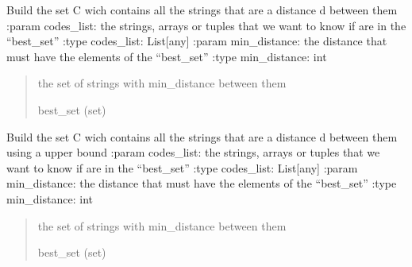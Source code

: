 \documentclass[letterpaper,10pt,english]{sphinxmanual}
\begin{document}
\begin{fulllineitems}
\label{\detokenize{index:hammindist.functions.max_set}}
\pysigstartsignatures
\pysiglinewithargsret
{}
{\sphinxparamcomma {}}
{}
\pysigstopsignatures
\sphinxAtStartPar
Build the set C wich contains all the strings that are a distance d between them
:param codes\_list: the strings, arrays or tuples that we want to know if are in the “best\_set”
:type codes\_list: List{[}any{]}
:param min\_distance: the distance that must have the elements of the “best\_set”
:type min\_distance: int
\begin{quote}\begin{description}
\sphinxAtStartPar
the set of strings with min\_distance between them

\sphinxAtStartPar
best\_set (set)

\end{description}\end{quote}

\end{fulllineitems}


\begin{fulllineitems}
\label{\detokenize{index:hammindist.functions.max_set_bounded}}
\pysigstartsignatures
\pysiglinewithargsret
{}
{\sphinxparamcomma {}}
{}
\pysigstopsignatures
\sphinxAtStartPar
Build the set C wich contains all the strings that are a distance d between
them using a upper bound
:param codes\_list: the strings, arrays or tuples that we want to know if are in the “best\_set”
:type codes\_list: List{[}any{]}
:param min\_distance: the distance that must have the elements of the “best\_set”
:type min\_distance: int
\begin{quote}\begin{description}
\sphinxAtStartPar
the set of strings with min\_distance between them

\sphinxAtStartPar
best\_set (set)

\end{description}\end{quote}

\end{fulllineitems}
\end{document}
